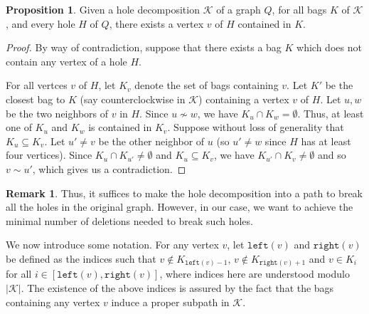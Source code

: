 \documentclass{article}
\theoremstyle{definition}
\newtheorem{prop}[thm]{Proposition}
\newtheorem{rmk}[thm]{Remark}
\begin{document}
    \begin{prop} \label{hole prop}
        Given a hole decomposition $\mathcal{K}$ of
        a graph $Q$,
        for all bags $K$ of $\mathcal{K}$,
        and every hole $H$ of $Q$,
        there exists a vertex $v$ 
        of $H$ contained in $K$.
    \end{prop}
    \begin{proof}
        By way of contradiction,
        suppose that there exists a 
        bag $K$ which does not 
        contain any vertex of a hole $H$.
        
        For all vertces $v$ of $H$, 
        let $K_{v}$ denote the
        set of bags containing $v$. 
        Let $K'$ be the closest bag
        to $K$ (say counterclockwise in $\mathcal{K}$)
        containing a vertex $v$ of $H$.
        Let $u, w$ be the two neighbors
        of $v$ in $H$.
        Since $u \not\sim w$, we have
        $K_{u} \cap K_{w} = \emptyset$.
        Thus, at least one of $K_{u}$ 
        and $K_{w}$ is contained
        in $K_{v}$. Suppose
        without loss of generality
        that $K_{u} \subseteq K_{v}$.
        Let $u' \neq v$ be the other
        neighbor of $u$
        (so $u' \neq w$ since $H$ has at 
        least four vertices). Since
        $K_{u} \cap K_{u'} \neq \emptyset$
        and $K_{u} \subseteq K_{v}$,
        we have $K_{u'} \cap K_{v} \neq \emptyset$
        and so $v \sim u'$, which
        gives us a contradiction.
    \end{proof}

    \begin{rmk} \label{hole rmk}
        Thus, it suffices to make the hole
        decomposition
        into a path to break all the holes
        in the original graph.
        However, in our case, we want
        to achieve the 
        minimal number of 
        deletions needed 
        to break such holes.      
    \end{rmk}

    We now introduce some notation.
    For any vertex $v$, let 
    $\texttt{left}\left(v\right)$
    and $\texttt{right}\left(v\right)$ 
    be defined as the indices such that
    $v \not \in K _{\texttt{left}\left(v\right)-1}$,
    $v \not \in K_{\texttt{right}\left(v\right)+1}$ 
    and $v \in K_{i}$ for all 
    $i \in \left[\texttt{left}\left(v\right), \texttt{right}\left(v\right)\right]$,
    where indices here are understood
    modulo $\left|\mathcal{K}\right|$.
    The existence of the
    above indices is
    assured by the fact that 
    the bags containing
    any vertex $v$ induce a proper subpath
    in $\mathcal{K}$.
\end{document}
